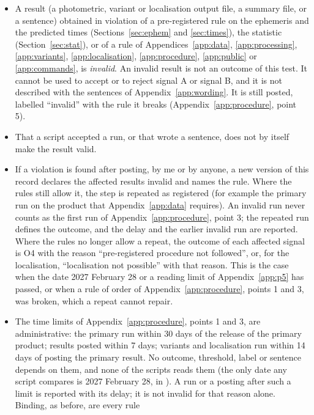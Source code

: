\begin{itemize}
\item A result (a photometric, variant or localisation output file, a summary file, or a sentence) obtained in
  violation of a pre-registered rule on the ephemeris and the predicted times (Sections~\ref{sec:ephem} and
  \ref{sec:times}), the statistic (Section~\ref{sec:stat}), or of a rule of Appendices~\ref{app:data}, \ref{app:processing}, \ref{app:variants},
  \ref{app:localisation}, \ref{app:procedure}, \ref{app:public} or \ref{app:commands}, is \emph{invalid}. An invalid result is not an
  outcome of this test. It cannot be used to accept or to reject signal A or signal B, and it is not described with the
  sentences of Appendix~\ref{app:wording}. It is still posted, labelled ``invalid'' with the rule it breaks
  (Appendix~\ref{app:procedure}, point 5).
\item That a script accepted a run, or that  wrote a sentence, does not by itself make the result
  valid.
\item If a violation is found after posting, by me or by anyone, a new version of this record declares the affected
  results invalid and names the rule. Where the rules still allow it, the step is repeated as registered (for example
  the primary run on the product that Appendix~\ref{app:data} requires). An invalid run never counts as the first run of
  Appendix~\ref{app:procedure}, point 3; the repeated run defines the outcome, and the delay and the earlier invalid run
  are reported. Where the rules no longer allow a repeat, the outcome of each affected signal is O4 with the reason
  ``pre-registered procedure not followed'', or, for the localisation, ``localisation not possible'' with that reason.
  This is the case when the date 2027 February 28 or a reading limit of Appendix~\ref{app:p5} has passed, or when a rule
  of order of Appendix~\ref{app:procedure}, points 1 and 3, was broken, which a repeat cannot repair.
\item The time limits of Appendix~\ref{app:procedure}, points 1 and 3, are administrative: the primary run within 30 days
  of the release of the primary product; results posted within 7 days; variants and localisation run within 14 days of
  posting the primary result. No outcome, threshold, label or sentence depends on them, and none of the scripts reads
  them (the only date any script compares is 2027 February 28, in ). A run or a posting after
  such a limit is reported with its delay; it is not invalid for that reason alone. Binding, as before, are every rule

\end{itemize}
